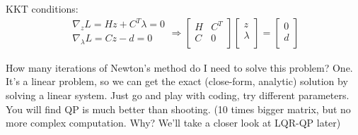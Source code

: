 KKT conditions:
\begin{equation}
    \begin{array}{c}
        \nabla _zL=Hz+C^T\lambda =0\\
        \nabla _{\lambda}L=Cz-d=0\\
    \end{array}\Rightarrow \left[ \begin{matrix}
        H&		C^T\\
        C&		0\\
    \end{matrix} \right] \left[ \begin{array}{c}
        z\\
        \lambda\\
    \end{array} \right] =\left[ \begin{array}{c}
        0\\
        d\\
    \end{array} \right] 
\end{equation}

How many iterations of Newton's method do I need to solve this problem? One. It's a linear problem, so we can get the exact (close-form, analytic) solution by solving a linear system. Just go and play with coding, try different parameters. You will find QP is much better than shooting. (10 times bigger matrix, but no more complex computation. Why? We'll take a closer look at LQR-QP later)

